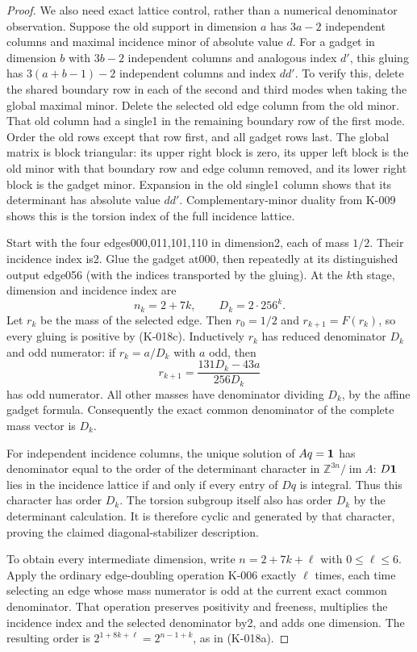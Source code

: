 \begin{proof}
We also need exact lattice control, rather than a numerical
denominator observation.  Suppose the old support in dimension
$a$ has $3a-2$ independent columns and maximal incidence minor of
absolute value $d$.  For a gadget in dimension $b$ with $3b-2$
independent columns and analogous index $d'$, this gluing has
$3(a+b-1)-2$ independent columns and index $dd'$.  To verify this,
delete the shared boundary row in each of the second and third
modes when taking the global maximal minor.  Delete the selected
old edge column from the old minor.  That old column had a single1
in the remaining boundary row of the first mode.  Order the old
rows except that row first, and all gadget rows last.  The global
matrix is block triangular: its upper right block is zero, its
upper left block is the old minor with that boundary row and edge
column removed, and its lower right block is the gadget minor.
Expansion in the old single1 column shows that its determinant has
absolute value $dd'$.  Complementary-minor duality from K-009
shows this is the torsion index of the full incidence lattice.

Start with the four edges000,011,101,110 in dimension2, each of
mass $1/2$.  Their incidence index is2.  Glue the gadget at000,
then repeatedly at its distinguished output edge056 (with the
indices transported by the gluing).  At the $k$th stage, dimension
and incidence index are
\[
                     n_k=2+7k,\qquad D_k=2\cdot256^k.
\]
Let $r_k$ be the mass of the selected edge.  Then
$r_0=1/2$ and $r_{k+1}=F(r_k)$, so every gluing is positive by
(K-018c).  Inductively $r_k$ has reduced denominator $D_k$ and
odd numerator: if $r_k=a/D_k$ with $a$ odd, then
\[
           r_{k+1}=\frac{131D_k-43a}{256D_k}
\]
has odd numerator.  All other masses have denominator dividing
$D_k$, by the affine gadget formula.  Consequently the exact
common denominator of the complete mass vector is $D_k$.

For independent incidence columns, the unique solution of
$Aq={\bf1}$ has denominator equal to the order of the determinant
character in $\mathbb Z^{3n}/\operatorname{im}A$:
$D{\bf1}$ lies in the incidence lattice if and only if every entry
of $Dq$ is integral.  Thus this character has order $D_k$.
The torsion subgroup itself also has order $D_k$ by the determinant
calculation.  It is therefore cyclic and generated by that
character, proving the claimed diagonal-stabilizer description.

To obtain every intermediate dimension, write
$n=2+7k+\ell$ with $0\le\ell\le6$.  Apply the ordinary edge-doubling
operation K-006 exactly $\ell$ times, each time selecting an edge
whose mass numerator is odd at the current exact common denominator.
That operation preserves positivity and freeness, multiplies the
incidence index and the selected denominator by2, and adds one
dimension.  The resulting order is
$2^{1+8k+\ell}=2^{n-1+k}$, as in (K-018a).


\end{proof}
